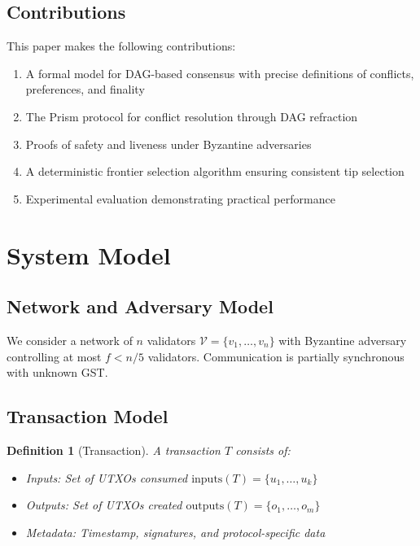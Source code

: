 \documentclass[11pt,a4paper]{article}
\newtheorem{definition}{Definition}
\begin{document}
\subsection{Contributions}

This paper makes the following contributions:

\begin{enumerate}
    \item A formal model for DAG-based consensus with precise definitions of conflicts, preferences, and finality
    \item The Prism protocol for conflict resolution through DAG refraction
    \item Proofs of safety and liveness under Byzantine adversaries
    \item A deterministic frontier selection algorithm ensuring consistent tip selection
    \item Experimental evaluation demonstrating practical performance
\end{enumerate}

\section{System Model}

\subsection{Network and Adversary Model}

We consider a network of $n$ validators $\mathcal{V} = \{v_1, \ldots, v_n\}$ with Byzantine adversary controlling at most $f < n/5$ validators. Communication is partially synchronous with unknown GST.

\subsection{Transaction Model}

\begin{definition}[Transaction]
A transaction $T$ consists of:
\begin{itemize}
    \item Inputs: Set of UTXOs consumed $\text{inputs}(T) = \{u_1, \ldots, u_k\}$
    \item Outputs: Set of UTXOs created $\text{outputs}(T) = \{o_1, \ldots, o_m\}$
    \item Metadata: Timestamp, signatures, and protocol-specific data
\end{itemize}
\end{definition}
\end{document}

